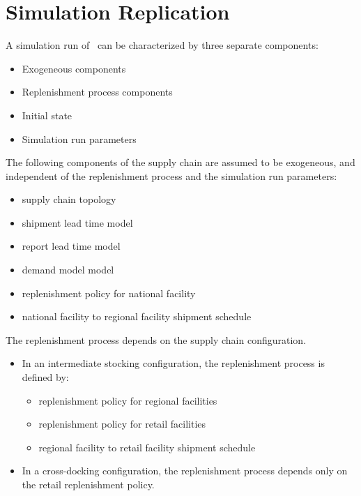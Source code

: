 \clearpage





\section{Simulation Replication}
\label{section:conceptual-model->simulator-replication}

A simulation run of \scs\ can be characterized by three separate components:
\begin{itemize}
  \item Exogeneous components
  \item Replenishment process components
  \item Initial state
  \item Simulation run parameters
\end{itemize}

The following components of the supply chain
are assumed to be exogeneous,
and independent of the replenishment process
and the simulation run parameters:
\begin{itemize}
  \item supply chain topology
  \item shipment lead time model
  \item report lead time model
  \item demand model model
  \item replenishment policy for national facility
  \item national facility to regional facility shipment schedule
\end{itemize}

The replenishment process depends on the supply chain configuration.
\begin{itemize}
  \item
    In an intermediate stocking configuration,
    the replenishment process is defined by:
    \begin{itemize}
      \item replenishment policy for regional facilities
      \item replenishment policy for retail facilities
      \item regional facility to retail facility shipment schedule
    \end{itemize}
  \item
    In a cross-docking configuration,
    the replenishment process depends only on the retail replenishment policy.
\end{itemize}

